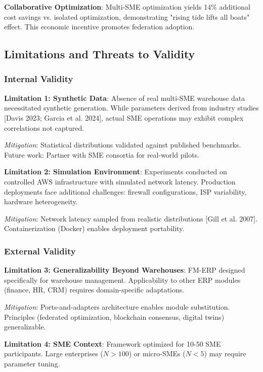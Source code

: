 \documentclass[times,10pt,twocolumn]{jucs2e}
\begin{document}
\textbf{Collaborative Optimization}: Multi-SME optimization yields 14\% additional cost savings vs. isolated optimization, demonstrating "rising tide lifts all boats" effect. This economic incentive promotes federation adoption.

\subsection{Limitations and Threats to Validity}

\subsubsection{Internal Validity}

\textbf{Limitation 1: Synthetic Data}: Absence of real multi-SME warehouse data necessitated synthetic generation. While parameters derived from industry studies [Davis 2023; Garcia et al. 2024], actual SME operations may exhibit complex correlations not captured.

\textit{Mitigation}: Statistical distributions validated against published benchmarks. Future work: Partner with SME consortia for real-world pilots.

\textbf{Limitation 2: Simulation Environment}: Experiments conducted on controlled AWS infrastructure with simulated network latency. Production deployments face additional challenges: firewall configurations, ISP variability, hardware heterogeneity.

\textit{Mitigation}: Network latency sampled from realistic distributions [Gill et al. 2007]. Containerization (Docker) enables deployment portability.

\subsubsection{External Validity}

\textbf{Limitation 3: Generalizability Beyond Warehouses}: FM-ERP designed specifically for warehouse management. Applicability to other ERP modules (finance, HR, CRM) requires domain-specific adaptations.

\textit{Mitigation}: Ports-and-adapters architecture enables module substitution. Principles (federated optimization, blockchain consensus, digital twins) generalizable.

\textbf{Limitation 4: SME Context}: Framework optimized for 10-50 SME participants. Large enterprises ($N > 100$) or micro-SMEs ($N < 5$) may require parameter tuning.
\end{document}

